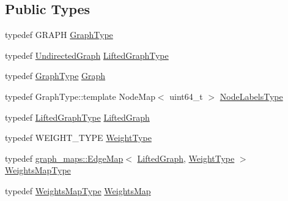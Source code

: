 \subsection*{Public Types}
\begin{DoxyCompactItemize}
\item 
typedef G\+R\+A\+P\+H \hyperlink{classnifty_1_1graph_1_1lifted__multicut_1_1LiftedMulticutObjective_a1b5ca1bdd020702b0ad4ca4ed771d436}{Graph\+Type}
\item 
typedef \hyperlink{classnifty_1_1graph_1_1UndirectedGraph}{Undirected\+Graph} \hyperlink{classnifty_1_1graph_1_1lifted__multicut_1_1LiftedMulticutObjective_a36897aad1d8e54db8d3da097c1a6c00f}{Lifted\+Graph\+Type}
\item 
typedef \hyperlink{classnifty_1_1graph_1_1lifted__multicut_1_1LiftedMulticutObjective_a1b5ca1bdd020702b0ad4ca4ed771d436}{Graph\+Type} \hyperlink{classnifty_1_1graph_1_1lifted__multicut_1_1LiftedMulticutObjective_a09c1023d4317152e280bb5e0ede7e4a9}{Graph}
\item 
typedef Graph\+Type\+::template Node\+Map$<$ uint64\+\_\+t $>$ \hyperlink{classnifty_1_1graph_1_1lifted__multicut_1_1LiftedMulticutObjective_acb83822c1988d6ea4b3390a508974a92}{Node\+Labels\+Type}
\item 
typedef \hyperlink{classnifty_1_1graph_1_1lifted__multicut_1_1LiftedMulticutObjective_a36897aad1d8e54db8d3da097c1a6c00f}{Lifted\+Graph\+Type} \hyperlink{classnifty_1_1graph_1_1lifted__multicut_1_1LiftedMulticutObjective_a3e047dd820c11fb2df428de46d7a5cab}{Lifted\+Graph}
\item 
typedef W\+E\+I\+G\+H\+T\+\_\+\+T\+Y\+P\+E \hyperlink{classnifty_1_1graph_1_1lifted__multicut_1_1LiftedMulticutObjective_abed7e2553691af6e16c0b400dcc05c63}{Weight\+Type}
\item 
typedef \hyperlink{structnifty_1_1graph_1_1graph__maps_1_1EdgeMap}{graph\+\_\+maps\+::\+Edge\+Map}$<$ \hyperlink{classnifty_1_1graph_1_1lifted__multicut_1_1LiftedMulticutObjective_a3e047dd820c11fb2df428de46d7a5cab}{Lifted\+Graph}, \hyperlink{classnifty_1_1graph_1_1lifted__multicut_1_1LiftedMulticutObjective_abed7e2553691af6e16c0b400dcc05c63}{Weight\+Type} $>$ \hyperlink{classnifty_1_1graph_1_1lifted__multicut_1_1LiftedMulticutObjective_a1bedc00e04e909f65ce2017855a317ac}{Weights\+Map\+Type}
\item 
typedef \hyperlink{classnifty_1_1graph_1_1lifted__multicut_1_1LiftedMulticutObjective_a1bedc00e04e909f65ce2017855a317ac}{Weights\+Map\+Type} \hyperlink{classnifty_1_1graph_1_1lifted__multicut_1_1LiftedMulticutObjective_a2063225a63332d8a74f82fef80f09d0b}{Weights\+Map}
\end{DoxyCompactItemize}
